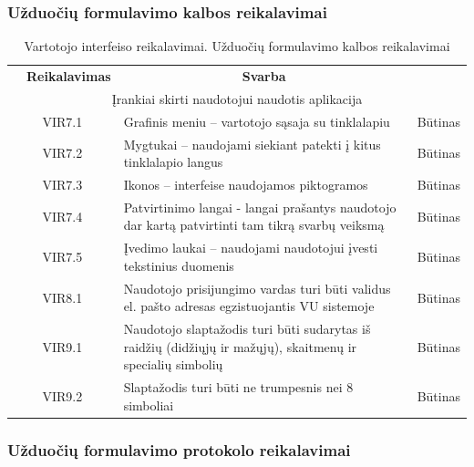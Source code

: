 \documentclass{VUMIFPSkursinis}
\begin{document}
\subsubsection{Užduočių formulavimo kalbos reikalavimai}
\begin{table}[H]
	\caption{Vartotojo interfeiso reikalavimai. Užduočių formulavimo kalbos reikalavimai}
	\begin{tabular}{|p{1cm}|p{1cm}|p{}|p{}|}
		\hline
		\rowcolor{lightgray}
		\multicolumn{4}{|c|}{3. Užduočių formulavimo kalbos reikalavimai}\\		
		\hline 
		\rowcolor{gray!50}
		\multicolumn{2}{|c|}{{\bfseries Kodas}}&\multicolumn{1}{c|}{{\bfseries Reikalavimas}}&\multicolumn{1}{c|}{{\bfseries Svarba}}\\
		\hline
		\multicolumn{4}{|c|}{Įrankiai skirti naudotojui naudotis aplikacija}\\	\hline
		\multicolumn{2}{|c|}{VIR7.1}&{Grafinis meniu – vartotojo sąsaja su tinklalapiu}&\multicolumn{1}{c|}{Būtinas}\\
		\hline
		\multicolumn{2}{|c|}{VIR7.2}&{Mygtukai – naudojami siekiant patekti į kitus tinklalapio langus}&\multicolumn{1}{c|}{Būtinas}\\
		\hline
		\multicolumn{2}{|c|}{VIR7.3}&{Ikonos – interfeise naudojamos piktogramos}&\multicolumn{1}{c|}{Būtinas}\\
		\hline
		\multicolumn{2}{|c|}{VIR7.4}&{Patvirtinimo langai - langai prašantys naudotojo dar kartą patvirtinti tam tikrą svarbų veiksmą}&\multicolumn{1}{c|}{Būtinas}\\
		\hline
		\multicolumn{2}{|c|}{VIR7.5}&{Įvedimo laukai – naudojami naudotojui įvesti tekstinius duomenis}&\multicolumn{1}{c|}{Būtinas}\\
		\hline
		\multicolumn{2}{|c|}{VIR8.1}&{Naudotojo prisijungimo vardas turi būti validus el. pašto adresas egzistuojantis VU sistemoje}&\multicolumn{1}{c|}{Būtinas}\\
		\hline
		\multicolumn{2}{|c|}{VIR9.1}&{Naudotojo slaptažodis turi būti sudarytas iš raidžių (didžiųjų ir mažųjų), skaitmenų ir specialių simbolių}&\multicolumn{1}{c|}{Būtinas}\\
		\hline
		\multicolumn{2}{|c|}{VIR9.2}&{Slaptažodis turi būti ne trumpesnis nei 8 simboliai}&\multicolumn{1}{c|}{Būtinas}\\
		\hline
	\end{tabular}		
\end{table}

\subsubsection{Užduočių formulavimo protokolo reikalavimai}
\end{document}

